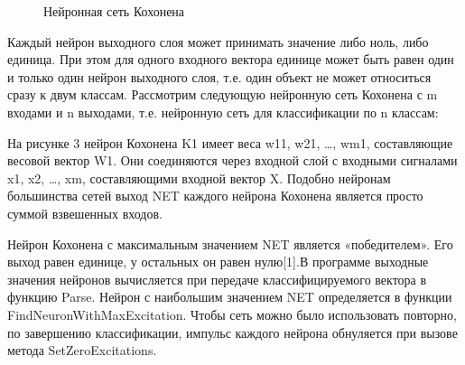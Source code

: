 \documentclass[14pt,a4paper]{extreport}
\begin{document}
  \begin{figure}[h!]
\caption{Нейронная сеть Кохонена}
\end{figure}
  
  \hspace {4ex} Каждый нейрон выходного слоя может принимать значение либо ноль, либо единица. При этом для одного входного вектора единице может быть равен один и только один нейрон выходного слоя, т.е. один объект не может относиться сразу к двум классам. 
Рассмотрим следующую нейронную сеть Кохонена с m входами и n выходами, т.е. нейронную сеть для классификации по n классам:\

  
  \hspace {4ex} На рисунке 3 нейрон Кохонена K1 имеет веса w11, w21, …, wm1, составляющие весовой вектор W1. Они соединяются через входной слой с входными сигналами x1, x2, …, xm, составляющими входной вектор X. Подобно нейронам большинства сетей выход NET каждого нейрона Кохонена является просто суммой взвешенных входов.\
  
  \hspace {4ex} Нейрон Кохонена с максимальным значением NET является «победителем». Его выход равен единице, у остальных он равен нулю[1].В программе выходные значения  нейронов вычисляется при передаче классифицируемого вектора в функцию  Parse. Нейрон с наибольшим значением NET определяется в функции FindNeuronWithMaxExcitation. Чтобы сеть можно было использовать повторно, по завершению классификации, импульс каждого нейрона обнуляется при вызове метода SetZeroExcitations.


\end{document}

